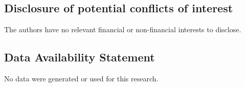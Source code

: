 \documentclass[11pt]{amsart}
\theoremstyle{plain}
\theoremstyle{definition}
\numberwithin{equation}{section}
\numberwithin{figure}{section}
\begin{document}
\subsection*{Disclosure of potential conflicts of interest} The authors have no relevant financial or non-financial interests to disclose.

\subsection*{Data Availability Statement} No data were generated or used for this research. 



\newcommand{\etalchar}[1]{$^{#1}$}
\providecommand{\bysame}{\leavevmode\hbox to3em{\hrulefill}\thinspace}
\providecommand{\MR}{\relax\ifhmode\unskip\space\fi MR }
\providecommand{\MRhref}[2]{%
  \href{http://www.ams.org/mathscinet-getitem?mr=#1}{#2}
}
\providecommand{\href}[2]{#2}
\end{document}
